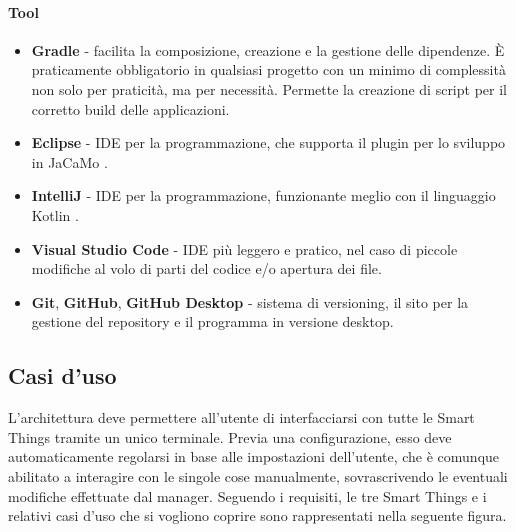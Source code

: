 \documentclass[12pt,a4paper,openright,oneside]{report}
\begin{document}
\paragraph{Tool}
\begin{itemize}
	\item \textbf{Gradle} \cite{gradle} - facilita la composizione, creazione e la gestione delle dipendenze. È praticamente obbligatorio in qualsiasi progetto con un minimo di complessità non solo per praticità, ma per necessità. Permette la creazione di script per il corretto build delle applicazioni.
	
	\item \textbf{Eclipse} \cite{eclipse} - IDE per la programmazione, che supporta il plugin per lo sviluppo in JaCaMo  \cite{eclipse-j}.
	
	\item \textbf{IntelliJ} \cite{intellij} - IDE per la programmazione, funzionante meglio con il linguaggio Kotlin  \cite{intellij-k}.
	
	\item \textbf{Visual Studio Code} \cite{visualstudiocode} - IDE più leggero e pratico, nel caso di piccole modifiche al volo di parti del codice e/o apertura dei file.
	
	\item \textbf{Git}, \textbf{GitHub}, \textbf{GitHub Desktop} \cite{git} - sistema di versioning, il sito per la gestione del repository e il programma in versione desktop.
\end{itemize}

\subsection{Casi d'uso}
L'architettura deve permettere all'utente di interfacciarsi con tutte le Smart Things tramite un unico terminale. Previa una configurazione, esso deve automaticamente regolarsi in base alle impostazioni dell'utente, che è comunque abilitato a interagire con le singole cose manualmente, sovrascrivendo le eventuali modifiche effettuate dal manager. Seguendo i requisiti, le tre Smart Things e i relativi casi d'uso che si vogliono coprire sono rappresentati nella seguente figura.
\end{document}
